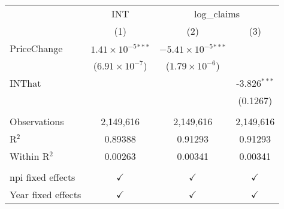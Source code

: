 
\begingroup
\centering
\begin{tabular}{lccc}
   \toprule
    & INT & \multicolumn{2}{c}{log\_claims}\\
                      & (1)                           & (2)                            & (3)\\  
   \midrule 
   PriceChange        & $1.41\times 10^{-5}$$^{***}$  & $-5.41\times 10^{-5}$$^{***}$  &   \\   
                      & ($6.91\times 10^{-7}$)        & ($1.79\times 10^{-6}$)         &   \\   
   INThat             &                               &                                & -3.826$^{***}$\\   
                      &                               &                                & (0.1267)\\   
    \\
   Observations       & 2,149,616                     & 2,149,616                      & 2,149,616\\  
   R$^2$              & 0.89388                       & 0.91293                        & 0.91293\\  
   Within R$^2$       & 0.00263                       & 0.00341                        & 0.00341\\  
    \\
   npi fixed effects  & $\checkmark$                  & $\checkmark$                   & $\checkmark$\\   
   Year fixed effects & $\checkmark$                  & $\checkmark$                   & $\checkmark$\\   
   \bottomrule
\end{tabular}
\par\endgroup


